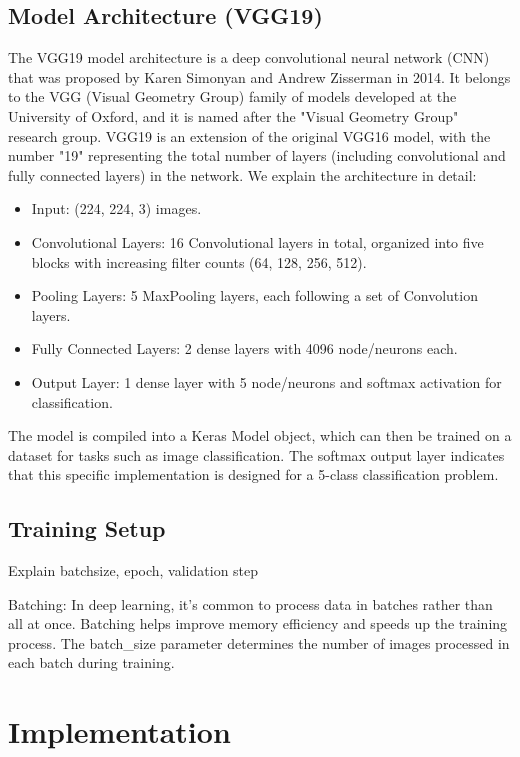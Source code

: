 \documentclass[12pt]{article}
\begin{document}
\subsection{Model Architecture (VGG19)}

The VGG19 model architecture is a deep convolutional neural network (CNN) that was proposed by Karen Simonyan and Andrew Zisserman in 2014. It belongs to the VGG (Visual Geometry Group) family of models developed at the University of Oxford, and it is named after the "Visual Geometry Group" research group. VGG19 is an extension of the original VGG16 model, with the number "19" representing the total number of layers (including convolutional and fully connected layers) in the network. We explain the architecture in detail:

\begin{itemize}
  \item Input: (224, 224, 3) images.
  \item Convolutional Layers:  16 Convolutional layers in total, organized into five blocks with increasing filter counts (64, 128, 256, 512).
  \item Pooling Layers: 5 MaxPooling layers, each following a set of Convolution layers.
  \item Fully Connected Layers: 2 dense layers with 4096 node/neurons each.
  \item Output Layer: 1 dense layer with 5 node/neurons and softmax activation for classification.
\end{itemize}

The model is compiled into a Keras Model object, which can then be trained on a dataset for tasks such as image classification. The softmax output layer indicates that this specific implementation is designed for a 5-class classification problem.

\subsection{Training Setup}

Explain batchsize, epoch, validation step

Batching: In deep learning, it's common to process data in batches rather than all at once. Batching helps improve memory efficiency and speeds up the training process. The batch\_size parameter determines the number of images processed in each batch during training.

\section{Implementation}
\end{document}

